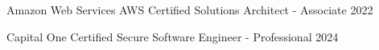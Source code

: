 
\begin{cvhonors}

\cvhonor
{Amazon Web Services} %
{AWS Certified Solutions Architect - Associate} %
{} %
{2022} %


  \cvhonor
  {Capital One} %
  {Certified Secure Software Engineer - Professional} %
  {} %
  {2024} %



\end{cvhonors}